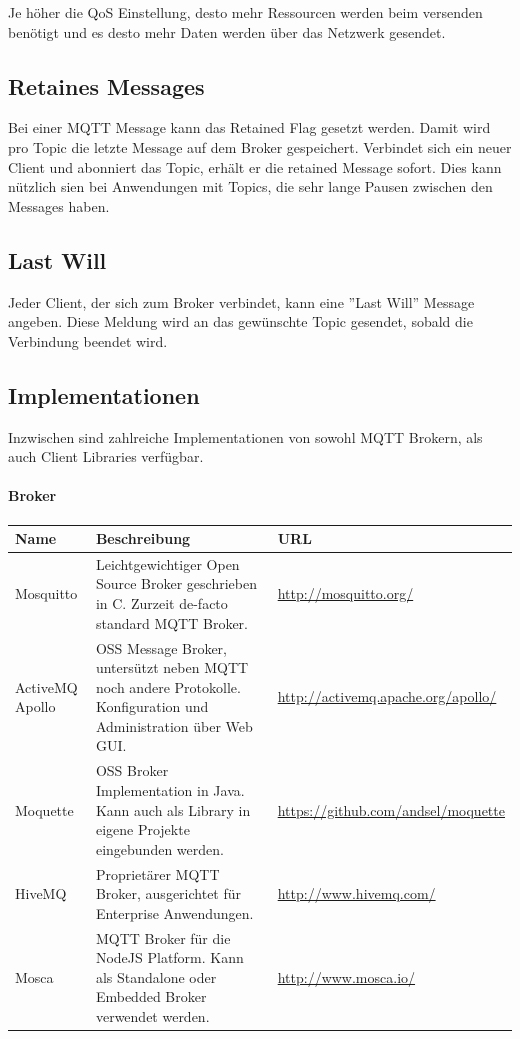 Je höher die QoS Einstellung, desto mehr Ressourcen werden beim versenden benötigt und es desto mehr Daten werden über das Netzwerk gesendet.

\subsection{Retaines Messages} \label{retained}
Bei einer MQTT Message kann das Retained Flag gesetzt werden. Damit wird pro Topic die letzte Message auf dem Broker gespeichert. Verbindet sich ein neuer Client und abonniert das Topic, erhält er die retained Message sofort. Dies kann nützlich sien bei Anwendungen mit Topics, die sehr lange Pausen zwischen den Messages haben.

\subsection{Last Will}
Jeder Client, der sich zum Broker verbindet, kann eine ''Last Will'' Message angeben. Diese Meldung wird an das gewünschte Topic gesendet, sobald die Verbindung beendet wird.

\pagebreak

\subsection{Implementationen}
Inzwischen sind zahlreiche Implementationen von sowohl MQTT Brokern, als auch Client Libraries verfügbar.

\paragraph{Broker}

\begin{center}
\begin{tabular}{ | m{5em} | m{25em}| m{12em} | }
 \hline \rowcolor{lightgray}
 Name & Beschreibung & URL \\
 \hline
 Mosquitto  & Leichtgewichtiger Open Source Broker geschrieben in C. Zurzeit de-facto standard MQTT Broker. & \url{http://mosquitto.org/}  \\
 \hline
 ActiveMQ Apollo   & OSS Message Broker, untersützt neben MQTT noch andere Protokolle. Konfiguration und Administration über Web GUI. & \url{http://activemq.apache.org/apollo/}  \\
  \hline
 Moquette  & OSS Broker Implementation in Java. Kann auch als Library in eigene Projekte eingebunden werden. & \url{https://github.com/andsel/moquette}  \\
 \hline
  HiveMQ  & Proprietärer MQTT Broker, ausgerichtet für Enterprise Anwendungen.  & \url{http://www.hivemq.com/}  \\
 \hline
  Mosca  & MQTT Broker für die NodeJS Platform. Kann als Standalone oder Embedded Broker verwendet werden.  & \url{http://www.mosca.io/}  \\
\hline

\end{tabular}
\end{center}



